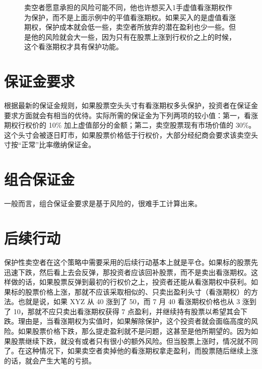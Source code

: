 \begin{figure}
    \centering
    \caption{卖空者愿意承担的风险可能不同，他也许想买入1手虚值看涨期权作为保护，而不是上面示例中的平值看涨期权。如果买入的是虚值看涨期权，保护成本就会低一些，卖空者所放弃的潜在盈利也少一些。但是他的风险就会大一些，因为只有在股票上涨到行权价之上的时候，这个看涨期权才具有保护功能。}
\end{figure}
\section{保证金要求}
根据最新的保证金规则，如果股票空头头寸有看涨期权多头保护，投资者在保证金要求方面就会有相当的优待。实际所需的保证金为下列两项的较小值：第一，看涨期权行权价的 10\% 加上虚值部分的金额；第二，卖空股票现有市场价值的 30\%。这个头寸会被逐日盯市，如果股票价格低于行权价，大部分经纪商会要求该卖空头寸按“正常”比率缴纳保证金。
\section{组合保证金}
一般而言，组合保证金要求是基于风险的，很难手工计算出来。
\section{后续行动}
保护性卖空者在这个策略中需要采用的后续行动基本上就是平仓。如果标的股票先迅速下跌，然后看上去会反弹，那投资者应该回补股票，而不是卖出看涨期权。这样做的话，如果股票反弹到最初的行权价之上，投资者还能从看涨期权中获利。如果标的股票价格上涨，那就不应该采取相似的、只卖出盈利头寸（看涨期权）的方法。也就是说，如果 XYZ 从 40 涨到了 50，而 7 月 40 看涨期权价格也从 3 涨到了 10，那就不应只卖出看涨期权获得 7 点盈利，并继续持有股票以希望其会下跌。理由是，当看涨期权为实值时，如果解除保护，这个投资者就会面临高度的风险。如果股票价格下跌，那么提走盈利就不是问题，这甚至是他所期望的。因为如果股票继续下跌，就没有或者只有很小的额外风险。但当股票上涨时，情况就不同了。在这种情况下，如果卖空者卖掉他的看涨期权拿走盈利，而股票随后继续上涨的话，就会产生大笔的亏损。

